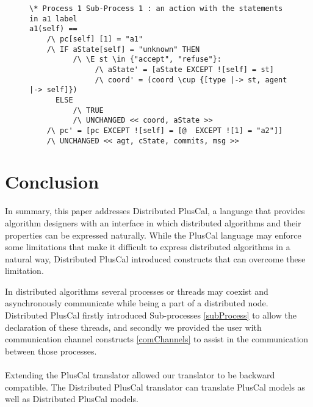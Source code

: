 \begin{enumerate}
\begin{figure}[!h]
\begin{lstlisting}[frame = tlrb, numbers=none]
\* Process 1 Sub-Process 1 : an action with the statements in a1 label
a1(self) ==
    /\ pc[self] [1] = "a1"
    /\ IF aState[self] = "unknown" THEN 
          /\ \E st \in {"accept", "refuse"}:
               /\ aState' = [aState EXCEPT ![self] = st]
               /\ coord' = (coord \cup {[type |-> st, agent |-> self]})
      ELSE 
          /\ TRUE
          /\ UNCHANGED << coord, aState >>
    /\ pc' = [pc EXCEPT ![self] = [@  EXCEPT ![1] = "a2"]]
    /\ UNCHANGED << agt, cState, commits, msg >>
\end{lstlisting}
\end{figure}
\FloatBarrier

\end{enumerate}

\section{Conclusion}
In summary, this paper addresses Distributed PlusCal, a language that provides algorithm designers with an interface in which distributed algorithms and their properties can be expressed naturally. While the PlusCal language may enforce some limitations that make it difficult to express distributed algorithms in a natural way, Distributed PlusCal introduced constructs that can overcome these limitation.

In distributed algorithms several processes or threads may coexist and asynchronously communicate while being a part of a distributed node. Distributed PlusCal firstly introduced Sub-processes \ref{subProcess} to allow the declaration of these threads, and secondly we provided the user with communication channel constructs \ref{comChannels} to assist in the communication between those processes.
\\\\
Extending the PlusCal translator allowed our translator to be backward compatible. The Distributed PlusCal translator can translate PlusCal models as well as Distributed PlusCal models.




